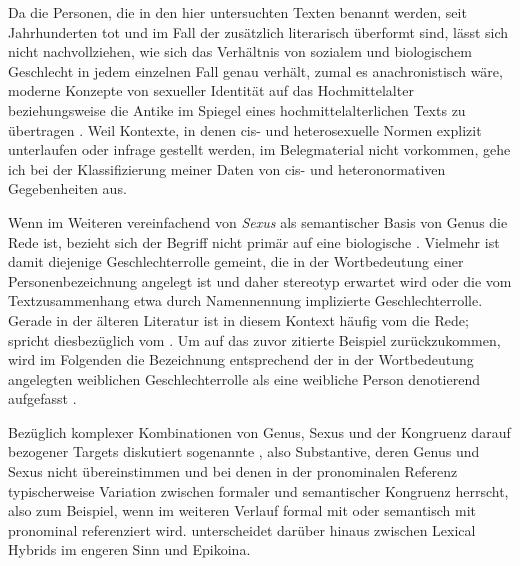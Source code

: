 Da die Personen, die in den hier untersuchten Texten benannt werden, seit
Jahrhunderten tot und im Fall der \KC{} zusätzlich literarisch überformt sind,
lässt sich nicht nachvollziehen, wie sich das Verhältnis von sozialem und
biologischem Geschlecht in jedem einzelnen Fall
genau verhält, zumal es anachronistisch wäre, moderne Konzepte von sexueller
Identität auf das Hochmittelalter beziehungsweise die
Antike im Spiegel eines hochmittelalterlichen Texts zu übertragen
\autocite[siehe z.\,B.][]{klinger2002}. Weil Kontexte, in denen cis- und
heterosexuelle Normen explizit unterlaufen oder infrage
gestellt werden, im Belegmaterial nicht vorkommen, gehe ich bei der
Klassifizierung meiner Daten von cis- und heteronormativen Gegebenheiten aus.

Wenn im Weiteren vereinfachend von \textit{Sexus} als semantischer Basis von
Genus die Rede ist, bezieht sich der Begriff nicht primär auf eine
biologische . Vielmehr ist damit
diejenige Geschlechter\-rolle gemeint, die in der
Wortbedeutung einer Personenbezeichnung angelegt ist und daher stereotyp
erwartet wird oder die vom Textzusammenhang etwa durch Namennennung implizierte
Geschlechterrolle. Gerade in der älteren Literatur ist in diesem Kontext häufig
vom  die Rede; \citet[67]{panther2009} spricht
diesbezüglich vom . Um auf das zuvor
zitierte Beispiel zurückzukommen, wird im Folgenden die Bezeichnung 
entsprechend der in der Wortbedeutung angelegten weiblichen Geschlechterrolle
als eine weibliche Person denotierend aufgefasst
\autocite[vgl.][s.\,v.~]{duden-online}.


Bezüglich komplexer Kombinationen von Genus, Sexus und der Kongruenz darauf
bezogener Targets diskutiert \citet[183--184]{corbett1991}
sogenannte , also
Substantive, deren Genus und Sexus nicht übereinstimmen und bei
denen in der pronominalen Referenz typischerweise Variation zwischen
formaler und semantischer
Kongruenz herrscht, also zum Beispiel, wenn  im weiteren Verlauf formal mit  oder semantisch mit 
pronominal referenziert wird. \citet{klein2022} unterscheidet darüber hinaus
zwischen Lexical Hybrids im engeren Sinn und
Epikoina.

